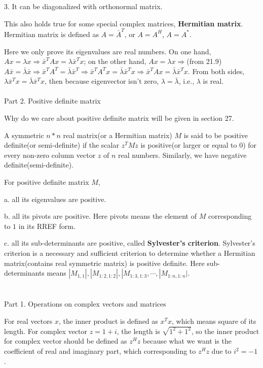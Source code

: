 \documentclass{article}
\begin{document}
\begin{spacing}{1.5}
\hspace*{0.5cm}3. It can be diagonalized with orthonormal matrix.

This also holds true for some special complex matrices, {\bfseries Hermitian matrix}. Hermitian matrix is defined as $A=\bar A^T$, or $A=A^H$, $A=A^*$.

Here we only prove its eigenvalues are real numbers. On one hand, $Ax=\lambda x \Rightarrow \bar x^T Ax=\lambda \bar x^T x$; on the other hand, $Ax=\lambda x \Rightarrow$(from 21.9)$ A\bar x=\bar\lambda \bar x \Rightarrow \bar x^T A^T=\bar\lambda \bar x^T \Rightarrow \bar x^T A^T x=\bar\lambda \bar x^T x \Rightarrow \bar x^T A x=\bar\lambda \bar x^T x$. From both sides, $\lambda \bar x^T x = \bar\lambda \bar x^T x$, then because eigenvector isn't zero, $\lambda = \bar\lambda$, i.e., $\lambda$ is real.
\\\\Part 2. Positive definite matrix

Why do we care about positive definite matrix will be given in section 27.

A symmetric $n * n$ real matrix(or a Hermitian matrix) $M$ is said to be positive definite(or semi-definite) if the scalar $z^T Mz$ is positive(or larger or equal to 0) for every non-zero column vector $z$ of $n$ real numbers. Similarly, we have negative definite(semi-definite).

For positive definite matrix $M$,

a. all its eigenvalues are positive.

b. all its pivots are positive. Here pivots means the element of $M$ corresponding to $1$ in its RREF form.

c. all its sub-determinants are positive, called {\bfseries Sylvester's criterion}. Sylvester’s criterion is a necessary and sufficient criterion to determine whether a Hermitian matrix(contains real symmetric matrix) is positive definite. Here sub-determinants means $|M_{1, 1}|, |M_{1:2, 1:2}|, |M_{1:3, 1:3}, \cdots, |M_{1:n, 1:n}|$.


\section{}
Part 1. Operations on complex vectors and matrices

For real vectors $x$, the inner product is defined as $x^Tx$, which means square of its length. For complex vector $z=1+i$, the length is $\sqrt{1^2+1^2}$, so the inner product for complex vector should be defined as $z^Hz$ because what we want is the coefficient of real and imaginary part, which corresponding to $z^Hz$ due to $i^2=-1$.


\end{spacing}
\end{document}
